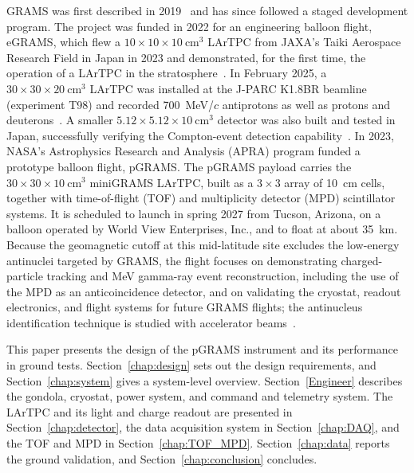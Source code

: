 \documentclass[a4paper,fleqn,longmktitle]{cas-dc}
\begin{document}
GRAMS was first described in 2019~\cite{aramaki2020dual} and has since followed a staged development program.
The project was funded in 2022 for an engineering balloon flight, eGRAMS, which flew a $10\times10\times10~\mathrm{cm^3}$ LArTPC from JAXA's Taiki Aerospace Research Field in Japan in 2023 and demonstrated, for the first time, the operation of a LArTPC in the stratosphere~\cite{Nakajima:2024fgx}.
In February 2025, a $30\times30\times20~\mathrm{cm^3}$ LArTPC was installed at the J-PARC K1.8BR beamline (experiment T98) and recorded 700~MeV/$c$ antiprotons as well as protons and deuterons~\cite{Yano:202503}.
A smaller $5.12\times5.12\times10~\mathrm{cm^3}$ detector was also built and tested in Japan, successfully verifying the Compton-event detection capability~\cite{TAKASHIMA2026171858}.
In 2023, NASA's Astrophysics Research and Analysis (APRA) program funded a prototype balloon flight, pGRAMS.
The pGRAMS payload carries the $30\times30\times10~\mathrm{cm^3}$ miniGRAMS LArTPC, built as a $3\times3$ array of 10~cm cells, together with time-of-flight (TOF) and multiplicity detector (MPD) scintillator systems.
It is scheduled to launch in spring 2027 from Tucson, Arizona, on a balloon operated by World View Enterprises, Inc., and to float at about 35~km.
Because the geomagnetic cutoff at this mid-latitude site excludes the low-energy antinuclei targeted by GRAMS, the flight focuses on demonstrating charged-particle tracking and MeV gamma-ray event reconstruction, including the use of the MPD as an anticoincidence detector, and on validating the cryostat, readout electronics, and flight systems for future GRAMS flights; the antinucleus identification technique is studied with accelerator beams~\cite{Yano:202503}.
 
This paper presents the design of the pGRAMS instrument and its performance in ground tests.
Section~\ref{chap:design} sets out the design requirements, and Section~\ref{chap:system} gives a system-level overview.
Section~\ref{Engineer} describes the gondola, cryostat, power system, and command and telemetry system.
The LArTPC and its light and charge readout are presented in Section~\ref{chap:detector}, the data acquisition system in Section~\ref{chap:DAQ}, and the TOF and MPD in Section~\ref{chap:TOF_MPD}.
Section~\ref{chap:data} reports the ground validation, and Section~\ref{chap:conclusion} concludes.
\end{document}
